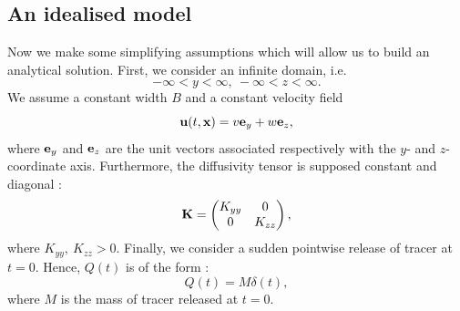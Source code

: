 \subsection*{An idealised model}
Now we make some simplifying assumptions which will allow us to build an analytical solution. First, we consider an infinite domain, i.e.
\begin{equation} \label{eq:testcase:domain}
	-\infty < y < \infty, \ -\infty < z < \infty.
\end{equation}
We assume a constant width $B$ and a constant velocity field
\begin{equation} \label{eq:testcase:velocity}
	\mathbf{u}(t,\mathbf{x}) = v \mathbf e_y + w \mathbf e_z,
\end{equation}
where $\mathbf e_y$ and $\mathbf e_z$ are the unit vectors associated respectively with the $y$- and $z$-coordinate axis. Furthermore, the diffusivity tensor is supposed constant and diagonal :
\begin{equation} \label{eq:testcase:diffusivity}
	\mathbf{K} = \begin{pmatrix}
			K_{yy} & 0 \\
			0 & K_{zz}
			\end{pmatrix},	
\end{equation}
where $K_{yy},\ K_{zz} > 0$. Finally, we consider a sudden pointwise release of tracer at $t=0$. Hence, $Q(t)$ is of the form :
\begin{equation}
	Q(t) = M\delta(t),
\end{equation} 
where $M$ is the mass of tracer released at $t=0$.

